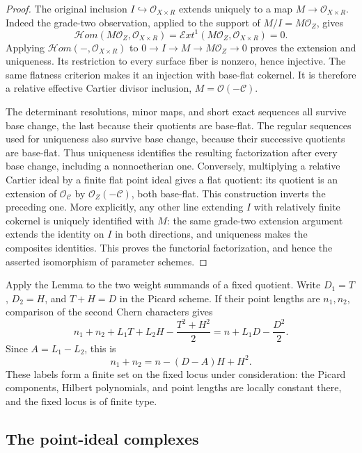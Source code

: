 \begin{proof}
The original inclusion \(I\hookrightarrow\mathcal O_{X\times R}\)
extends uniquely to a map \(M\to\mathcal O_{X\times R}\).
Indeed the grade-two observation, applied to the support of
\(M/I=M\mathcal O_Z\), gives
\[
 \mathcal{H}om(M\mathcal O_Z,\mathcal O_{X\times R})=
 \mathcal Ext^1(M\mathcal O_Z,\mathcal O_{X\times R})=0.
\]
Applying \(\mathcal{H}om(-,\mathcal O_{X\times R})\) to
\(0\to I\to M\to M\mathcal O_Z\to0\) proves the extension and uniqueness.
Its restriction to every surface fiber is nonzero, hence injective.
The same flatness criterion makes it an injection with base-flat
cokernel.  It is therefore a relative effective Cartier divisor
inclusion, \(M=\mathcal O(-\mathcal C)\).

The determinant resolutions, minor maps, and short exact sequences
all survive base change, the last because their quotients are
base-flat.  The regular sequences used for uniqueness also survive
base change, because their successive quotients are base-flat.
Thus uniqueness identifies the resulting factorization after every
base change, including a nonnoetherian one.
Conversely, multiplying a relative Cartier ideal by a finite flat
point ideal gives a flat quotient: its quotient is an extension of
\(\mathcal O_{\mathcal C}\) by \(\mathcal O_Z(-\mathcal C)\), both
base-flat.  This construction inverts the preceding one.  More
explicitly, any other line extending \(I\) with relatively finite
cokernel is uniquely identified with \(M\): the same grade-two
extension argument extends the identity on \(I\) in both directions,
and uniqueness makes the composites identities.  This proves the
functorial factorization, and hence the asserted isomorphism of
parameter schemes.
\end{proof}

Apply the Lemma to the two weight summands of a fixed quotient.  Write
\(D_1=T\), \(D_2=H\), and \(T+H=D\) in the Picard scheme.  If their
point lengths are \(n_1,n_2\), comparison of the second Chern characters
gives
\[
 n_1+n_2+L_1T+L_2H-\frac{T^2+H^2}{2}
 =n+L_1D-\frac{D^2}{2}.
\]
Since \(A=L_1-L_2\), this is
\begin{equation}\label{eq:length}
 n_1+n_2=n-(D-A)H+H^2.
\end{equation}
These labels form a finite set on the fixed locus under consideration:
the Picard components, Hilbert polynomials, and point lengths are
locally constant there, and the fixed locus is of finite type.

\subsection{The point-ideal complexes}


